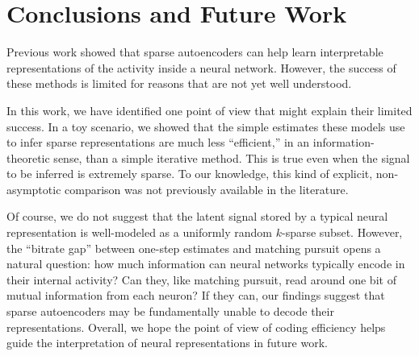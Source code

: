 \section{Conclusions and Future Work}

Previous work showed that sparse autoencoders can help learn interpretable representations of the activity inside a neural network. However, the success of these methods is limited for reasons that are not yet well understood.

In this work, we have identified one point of view that might explain their limited success. In a toy scenario, we showed that the simple estimates these models use to infer sparse representations are much less ``efficient,'' in an information-theoretic sense, than a simple iterative method. This is true even when the signal to be inferred is extremely sparse. To our knowledge, this kind of explicit, non-asymptotic comparison was not previously available in the literature.

Of course, we do not suggest that the latent signal stored by a typical neural representation is well-modeled as a uniformly random $k$-sparse subset. However, the ``bitrate gap'' between one-step estimates and matching pursuit opens a natural question: how much information can neural networks typically encode in their internal activity? Can they, like matching pursuit, read around one bit of mutual information from each neuron? If they can, our findings suggest that sparse autoencoders may be fundamentally unable to decode their representations. Overall, we hope the point of view of coding efficiency helps guide the interpretation of neural representations in future work.
